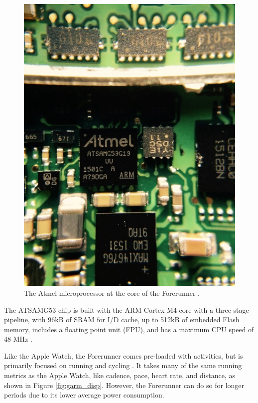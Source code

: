 \begin{figure}[h]
    \centering
    \includegraphics[scale=0.6]{media/garmin_teardown.jpg}
    \caption{The Atmel microprocessor at the core of the Forerunner \cite{forerunner_teardown}.}
    \label{fig:garmTear}
\end{figure}

The ATSAMG53 chip is built with the ARM Cortex-M4 core with a three-stage pipeline,
with 96kB of SRAM for I/D cache, 
up to 512kB of embedded Flash memory, includes a floating point unit 
(FPU), and has a maximum CPU speed of 48 MHz \cite{atmel_specs}.

Like the Apple Watch, the Forerunner comes pre-loaded with activities, but is primarily focused on
running and cycling \cite{garmin_price}. It takes many of the same running metrics as the Apple Watch,
like cadence, pace, heart rate, and distance, as shown in Figure \ref{fig:garm_disp}. 
However, the Forerunner can do so for longer periods due to its lower average power consumption.

